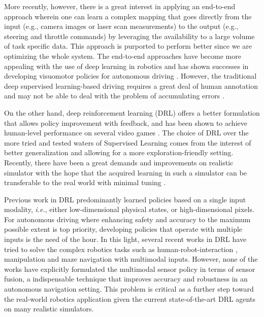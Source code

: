 \documentclass[../thesis.tex]{subfiles}
\begin{document}
More recently, however, there is a great interest in applying an end-to-end approach wherein one can learn a complex mapping that goes directly from the input (e.g., camera images or laser scan measurements) to the output (e.g., steering and throttle commands) by leveraging the availability to a large volume of task specific data. 
This approach is purported to perform better since we are optimizing the whole system. 
The end-to-end approaches have become more appealing with the use of deep learning in robotics and has shown successes in developing visuomotor policies for autonomous driving \cite{deepdriving,nvidiacar,endtoendcars}. 
However, the traditional deep supervised learning-based driving requires a great deal of human annotation and may not be able to deal with the problem of accumulating errors \cite{ross2011reduction}. 
 
 
On the other hand, deep reinforcement learning (DRL) offers a better formulation that allows policy improvement with feedback, and has been shown to achieve human-level performance on several video games \cite{mnih2013playing, mnih2015human,2016-TOG-deepRL}.
The choice of DRL over the more tried and tested waters of Supervised Learning comes from the interest of better generalization and allowing for a more exploration-friendly setting. 
Recently, there have been a great demands and improvements on realistic simulator \cite{deepdrive,udacity} with the hope that the acquired learning in such a simulator can be transferable to the real world with minimal tuning \cite{you2017virtual}. 
 
 
Previous work in DRL predominantly learned policies based on a single input modality, \textit{i.e.}, either low-dimensional physical states, or high-dimensional pixels. 
For autonomous driving where enhancing safety and accuracy to the maximum possible extent is top priority, developing policies that operate with multiple inputs is the need of the hour. 
In this light, several recent works in DRL have tried to solve the complex robotics tasks such as human-robot-interaction \cite{qureshi2016robot}, manipulation \cite{levine2016end} and maze navigation \cite{mirowski2017a} with multimodal inputs. 
However, none of the works have explicitly formulated the multimodal sensor policy in terms of sensor fusion, a indispensable technique that improves accuracy and robustness in an autonomous navigation setting. 
This problem is critical as a further step toward the real-world robotics application given the current state-of-the-art DRL agents on many realistic simulators.
 
\end{document}
